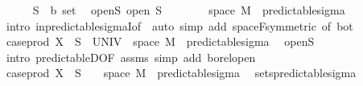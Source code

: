 \begin{isabellebody}
\isanewline
\ \ \ \ \isamarkupfalse%
\ S\ {\isacharcolon}{\kern0pt}{\isacharcolon}{\kern0pt}\ {\isachardoublequoteopen}{\isacharprime}{\kern0pt}b\ set{\isachardoublequoteclose}\ \isamarkupfalse%
\ open{\isacharunderscore}{\kern0pt}S{\isacharcolon}{\kern0pt}\ {\isachardoublequoteopen}open\ S{\isachardoublequoteclose}\isanewline
\ \ \ \ \isamarkupfalse%
\ {\isachardoublequoteopen}{\isacharbraceleft}{\kern0pt}{}{\isacharbraceright}{\kern0pt}\ {\isasymtimes}\ space\ M\ {\isasymin}\ predictable{\isacharunderscore}{\kern0pt}sigma{\isachardoublequoteclose}\ \isamarkupfalse%
\ {\isacharparenleft}{\kern0pt}intro\ in{\isacharunderscore}{\kern0pt}predictable{\isacharunderscore}{\kern0pt}sigmaI{\isacharbrackleft}{\kern0pt}of\ {\isachardoublequoteopen}{\isacharbraceleft}{\kern0pt}{}{\isacharbraceright}{\kern0pt}{\isachardoublequoteclose}{\isacharbrackright}{\kern0pt}{\isacharparenright}{\kern0pt}\ {\isacharparenleft}{\kern0pt}auto\ simp\ add{\isacharcolon}{\kern0pt}\ space{\isacharunderscore}{\kern0pt}F{\isacharbrackleft}{\kern0pt}symmetric{\isacharcomma}{\kern0pt}\ of\ bot{\isacharbrackright}{\kern0pt}{\isacharparenright}{\kern0pt}\isanewline
\ \ \ \ \isamarkupfalse%
\ \isamarkupfalse%
\ {\isachardoublequoteopen}case{\isacharunderscore}{\kern0pt}prod\ X\ {\isacharminus}{\kern0pt}{\isacharbackquote}{\kern0pt}\ S\ {\isasyminter}\ {\isacharparenleft}{\kern0pt}UNIV\ {\isasymtimes}\ space\ M{\isacharparenright}{\kern0pt}\ {\isasymin}\ predictable{\isacharunderscore}{\kern0pt}sigma{\isachardoublequoteclose}\ \isamarkupfalse%
\ open{\isacharunderscore}{\kern0pt}S\ \isamarkupfalse%
\ {\isacharparenleft}{\kern0pt}intro\ predictableD{\isacharbrackleft}{\kern0pt}OF\ assms{\isacharbrackright}{\kern0pt}{\isacharcomma}{\kern0pt}\ simp\ add{\isacharcolon}{\kern0pt}\ borel{\isacharunderscore}{\kern0pt}open{\isacharparenright}{\kern0pt}\ \ \isanewline
\ \ \ \ \isamarkupfalse%
\ \isamarkupfalse%
\ {\isachardoublequoteopen}case{\isacharunderscore}{\kern0pt}prod\ X\ {\isacharminus}{\kern0pt}{\isacharbackquote}{\kern0pt}\ S\ {\isasyminter}\ {\isacharparenleft}{\kern0pt}{\isacharbraceleft}{\kern0pt}{}{\isacharbraceright}{\kern0pt}\ {\isasymtimes}\ space\ M{\isacharparenright}{\kern0pt}\ {\isasymin}\ predictable{\isacharunderscore}{\kern0pt}sigma{\isachardoublequoteclose}\ \isamarkupfalse%
\ sets{\isacharunderscore}{\kern0pt}predictable{\isacharunderscore}{\kern0pt}sigma\ \isamarkupfalse%

\end{isabellebody}
